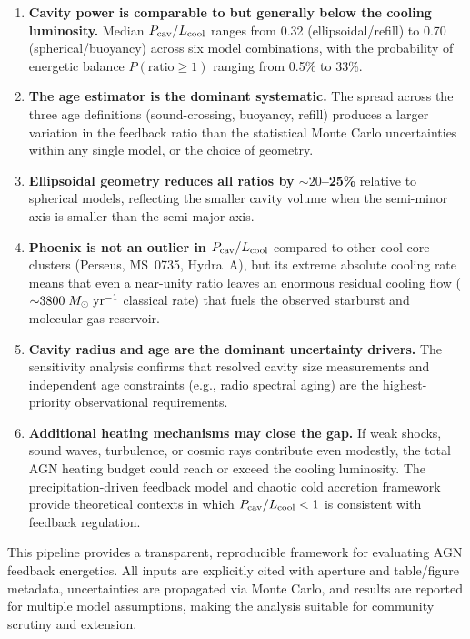 \documentclass[twocolumn]{aastex63}
\newcommand{\Msun}{M_{\odot}}
\newcommand{\Lcool}{L_{\rm cool}}
\newcommand{\Pcav}{P_{\rm cav}}
\newcommand{\yr}{\rm yr}
\begin{document}
\begin{enumerate}
  \item \textbf{Cavity power is comparable to but generally below the cooling
    luminosity.} Median $\Pcav/\Lcool$ ranges from 0.32 (ellipsoidal/refill) to
    0.70 (spherical/buoyancy) across six model combinations, with the
    probability of energetic balance $P(\mathrm{ratio} \geq 1)$ ranging from
    0.5\% to 33\%.

  \item \textbf{The age estimator is the dominant systematic.} The spread across
    the three age definitions (sound-crossing, buoyancy, refill) produces a
    larger variation in the feedback ratio than the statistical Monte Carlo
    uncertainties within any single model, or the choice of geometry.

  \item \textbf{Ellipsoidal geometry reduces all ratios by ${\sim}20$--25\%}
    relative to spherical models, reflecting the smaller cavity volume when the
    semi-minor axis is smaller than the semi-major axis.

  \item \textbf{Phoenix is not an outlier in $\Pcav/\Lcool$} compared to other
    cool-core clusters (Perseus, MS~0735, Hydra~A), but its extreme absolute
    cooling rate means that even a near-unity ratio leaves an enormous residual
    cooling flow (${\sim}3800\;\Msun\;\yr^{-1}$ classical rate) that fuels the
    observed starburst and molecular gas reservoir.

  \item \textbf{Cavity radius and age are the dominant uncertainty drivers.} The
    sensitivity analysis confirms that resolved cavity size measurements and
    independent age constraints (e.g., radio spectral aging) are the
    highest-priority observational requirements.

  \item \textbf{Additional heating mechanisms may close the gap.} If weak shocks,
    sound waves, turbulence, or cosmic rays contribute even modestly, the total
    AGN heating budget could reach or exceed the cooling luminosity. The
    precipitation-driven feedback model \citep{Voit2015} and chaotic cold
    accretion framework \citep{Gaspari2013} provide theoretical contexts in which
    $\Pcav/\Lcool < 1$ is consistent with feedback regulation.
\end{enumerate}

This pipeline provides a transparent, reproducible framework for evaluating AGN
feedback energetics. All inputs are explicitly cited with aperture and
table/figure metadata, uncertainties are propagated via Monte Carlo, and results
are reported for multiple model assumptions, making the analysis suitable for
community scrutiny and extension.
\end{document}
